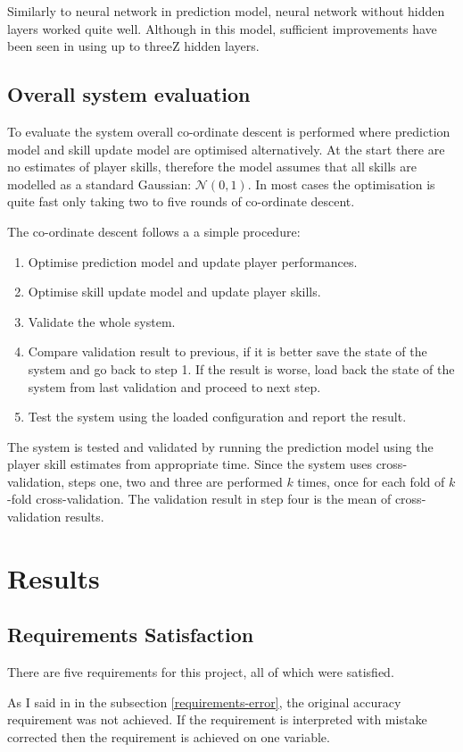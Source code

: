 \documentclass[12pt,a4paper]{book}
\begin{document}
Similarly to neural network in prediction model, neural network without hidden layers worked quite well.
Although in this model, sufficient improvements have been seen in using up to threeZ hidden layers.

\subsection{Overall system evaluation}
To evaluate the system overall co-ordinate descent is performed where prediction model and skill update model are optimised alternatively.
At the start there are no estimates of player skills, therefore the model assumes that all skills are modelled as a standard Gaussian: $\mathcal{N}(0,1)$.
In most cases the optimisation is quite fast only taking two to five rounds of co-ordinate descent.

The co-ordinate descent follows a a simple procedure:
\begin{enumerate}
\item Optimise prediction model and update player performances.
\item Optimise skill update model and update player skills.
\item Validate the whole system.
\item Compare validation result to previous, if it is better save the state of the system and go back to step 1.
If the result is worse, load back the state of the system from last validation and proceed to next step.
\item Test the system using the loaded configuration and report the result.
\end{enumerate}
The system is tested and validated by running the prediction model using the player skill estimates from appropriate time.
Since the system uses cross-validation, steps one, two and three are performed $k$ times, once for each fold of $k$-fold cross-validation.
The validation result in step four is the mean of cross-validation results.

\section{Results}
\subsection{Requirements Satisfaction}
There are five requirements for this project, all of which were satisfied.

As I said in in the subsection \ref{requirements-error}, the original accuracy requirement was not achieved.
If the requirement is interpreted with mistake corrected then the requirement is achieved on one variable.
\end{document}
